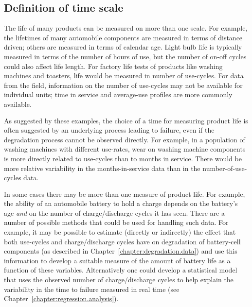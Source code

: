 \subsection{Definition of time scale}
\label{section:def.of.time.scale}
The life of many products can be measured on more than one scale.  For
example, the lifetimes of many automobile components are measured in
terms of distance driven; others are measured in terms of calendar
age. Light bulb life is typically measured in terms of the number of
hours of use, but the number of on-off cycles could also affect life
length. For factory life tests of products like washing machines and
toasters, life would be measured in number of use-cycles.  For data
from the field, information on the number of use-cycles may not be
available for individual units; time in service and average-use
profiles are more commonly available.

As suggested by these examples, the choice of a time for measuring
product life is often suggested by an underlying process leading to
failure, even if the degradation process cannot be observed directly.
For example, in a population of washing machines with different
use-rates, wear on washing machine components is more directly related
to use-cycles than to months in service.  There would be more relative
variability in the months-in-service data than in the
number-of-use-cycles data.

In some cases there may be more than one measure of product life.  For
example, the ability of an automobile battery to hold a charge depends
on the battery's age {\em and} on the number of charge/discharge
cycles it has seen. There are a number of possible methods that could
be used for handling such data. For example, it may be possible to
estimate (directly or indirectly) the effect that both use-cycles and
charge/discharge cycles have on degradation of battery-cell components
(as described in Chapter~\ref{chapter:degradation.data}) and use this
information to develop a suitable measure of the amount of battery
life as a function of these variables.  Alternatively one could
develop a statistical model that uses the observed number of
charge/discharge cycles to help explain the variability in the time to
failure measured in real time (see
Chapter~\ref{chapter:regression.analysis}).

